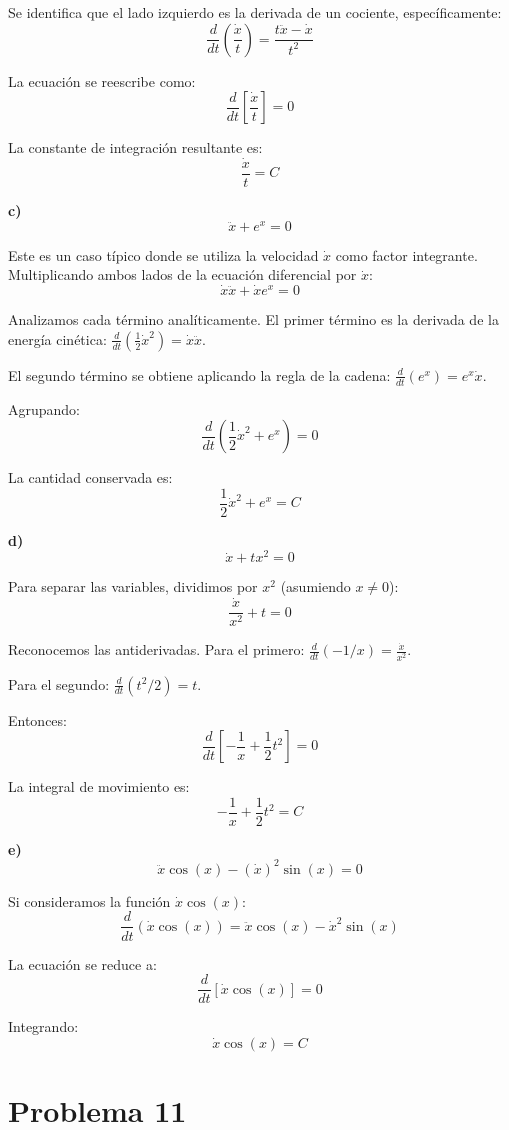 \documentclass[12pt, letterpaper]{article}
\begin{document}
Se identifica que el lado izquierdo es la derivada de un cociente, específicamente:
$$ \frac{d}{dt} \left( \frac{\dot{x}}{t} \right) = \frac{t\ddot{x} - \dot{x}}{t^2} $$

La ecuación se reescribe como:
$$ \frac{d}{dt} \left[ \frac{\dot{x}}{t} \right] = 0 $$

La constante de integración resultante es:
$$ \frac{\dot{x}}{t} = C $$

\textbf{c)} 
$$ \ddot{x} + e^x = 0 $$

Este es un caso típico donde se utiliza la velocidad $ \dot{x} $ como factor integrante. Multiplicando ambos lados de la ecuación diferencial por $ \dot{x} $:
$$ \dot{x}\ddot{x} + \dot{x}e^x = 0 $$

Analizamos cada término analíticamente. El primer término es la derivada de la energía cinética: 
$ \frac{d}{dt} \left(\frac{1}{2}\dot{x}^2\right) = \dot{x}\ddot{x} $. 

El segundo término se obtiene aplicando la regla de la cadena: 
$ \frac{d}{dt} (e^x) = e^x \dot{x} $. 

Agrupando:
$$ \frac{d}{dt} \left( \frac{1}{2}\dot{x}^2 + e^x \right) = 0 $$

La cantidad conservada es:
$$ \frac{1}{2}\dot{x}^2 + e^x = C $$

\textbf{d)} 
$$ \dot{x} + tx^2 = 0 $$

Para separar las variables, dividimos por $ x^2 $ (asumiendo $ x \neq 0 $):
$$ \frac{\dot{x}}{x^2} + t = 0 $$

Reconocemos las antiderivadas. Para el primero:
$ \frac{d}{dt} (-1/x) = \frac{\dot{x}}{x^2} $. 

Para el segundo:
$ \frac{d}{dt} (t^2/2) = t $. 

Entonces:
$$ \frac{d}{dt} \left[ -\frac{1}{x} + \frac{1}{2}t^2 \right] = 0 $$

La integral de movimiento es:
$$ -\frac{1}{x} + \frac{1}{2}t^2 = C $$

\textbf{e)} 
$$ \ddot{x} \cos(x) - (\dot{x})^2 \sin(x) = 0 $$

Si consideramos la función $ \dot{x} \cos(x) $:
$$ \frac{d}{dt} (\dot{x} \cos(x)) = \ddot{x} \cos(x) - \dot{x}^2 \sin(x) $$

La ecuación se reduce a:
$$ \frac{d}{dt} [\dot{x} \cos(x)] = 0 $$

Integrando:
$$ \dot{x} \cos(x) = C $$


\section{Problema 11}
\end{document}
